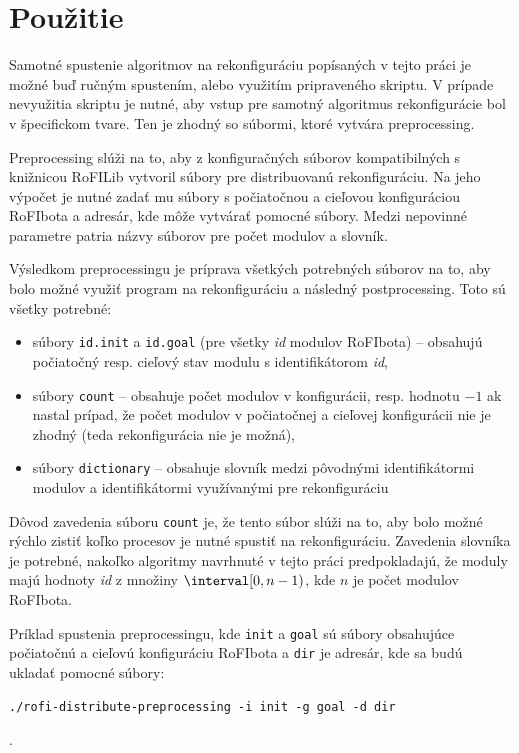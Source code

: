 \documentclass[
  digital, %
  oneside, %
  table,   %
  lof,     %
  nolot,     %
]{fithesis3}
\begin{document}
\section{Použitie}
Samotné spustenie algoritmov na rekonfiguráciu popísaných v tejto práci je možné buď ručným spustením, alebo využitím pripraveného skriptu. V prípade nevyužitia skriptu je nutné, aby vstup pre samotný algoritmus rekonfigurácie bol v špecifickom tvare. Ten je zhodný so súbormi, ktoré vytvára preprocessing. 

Preprocessing slúži na to, aby z konfiguračných súborov kompatibilných s knižnicou RoFILib vytvoril súbory pre distribuovanú rekonfiguráciu. Na jeho výpočet je nutné zadať mu súbory s počiatočnou a cieľovou konfiguráciou RoFIbota a adresár, kde môže vytvárať pomocné súbory. Medzi nepovinné parametre patria názvy súborov pre počet modulov a slovník. 

Výsledkom preprocessingu je príprava všetkých potrebných súborov na to, aby bolo možné využiť program na rekonfiguráciu a následný postprocessing. Toto sú všetky potrebné: 
\begin{itemize}
    \item súbory \texttt{id.init} a \texttt{id.goal} (pre všetky \textit{id} modulov RoFIbota) -- obsahujú počiatočný resp. cieľový stav modulu s identifikátorom \textit{id}, 
    \item súbory \texttt{count} -- obsahuje počet modulov v konfigurácii, resp. hodnotu $-1$ ak nastal prípad, že počet modulov v počiatočnej a cieľovej konfigurácii nie je zhodný (teda rekonfigurácia nie je možná), 
    \item súbory \texttt{dictionary} -- obsahuje slovník medzi pôvodnými identifikátormi modulov a identifikátormi využívanými pre rekonfiguráciu
\end{itemize}

Dôvod zavedenia súboru \texttt{count} je, že tento súbor slúži na to, aby bolo možné rýchlo zistiť koľko procesov je nutné spustiť na rekonfiguráciu. Zavedenia slovníka je potrebné, nakoľko algoritmy navrhnuté v tejto práci predpokladajú, že moduly majú hodnoty \textit{id} z množiny $\interval[0, n - 1)$, kde $n$ je počet modulov RoFIbota.

Príklad spustenia preprocessingu, kde \texttt{init} a \texttt{goal} sú súbory obsahujúce počiatočnú a cieľovú konfiguráciu RoFIbota a \texttt{dir} je adresár, kde sa budú ukladať pomocné súbory:

\begin{verbatim}
./rofi-distribute-preprocessing -i init -g goal -d dir
\end{verbatim}.
\end{document}
